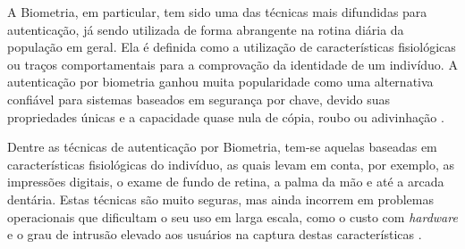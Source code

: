 

A Biometria, em particular, tem sido uma das técnicas mais difundidas para autenticação, já sendo utilizada de forma abrangente na rotina diária da população em geral. Ela é definida como a utilização de características fisiológicas ou traços comportamentais para a comprovação da identidade de um indivíduo. A autenticação por biometria ganhou muita popularidade como uma alternativa confiável para sistemas baseados em segurança por chave, devido suas propriedades únicas e a capacidade quase nula de cópia, roubo ou adivinhação \cite{kholmatov}.

Dentre as técnicas de autenticação por Biometria, tem-se aquelas baseadas em características fisiológicas do indivíduo, as quais levam em conta, por exemplo, as impressões digitais, o exame de fundo de retina, a palma da mão e até a arcada dentária. Estas técnicas são muito seguras, mas ainda incorrem em problemas operacionais que dificultam o seu uso em larga escala, como o custo com \emph{hardware} e o grau de intrusão elevado aos usuários na captura destas características \cite{heinen2002}. 

